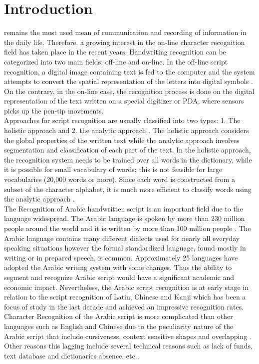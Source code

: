\documentclass[journal,compsoc]{IEEEtran}
\begin{document}
\IEEEdisplaynotcompsoctitleabstractindextext

\section{Introduction}
\date
{} remains the most used mean of communication and recording of information in the daily life. Therefore, a growing interest in the on-line character recognition field has taken place in the recent years. Handwriting recognition can be categorized into two main fields: off-line and on-line. In the off-line script recognition, a digital image containing text is fed to the computer and the system attempts to convert the spatial representation of the letters into digital symbols \cite{al2011online}. On the contrary, in the on-line case, the recognition process is done on the digital representation of the text written on a special digitizer or PDA, where sensors picks up the pen-tip movements.\\
 
Approaches for script recognition are usually classified into two types: 1. The holistic approach \cite{biadsy2011segmentation} and 2. the analytic approach \cite{abdulla2008off, sari2002off, Dinges2011, elanwar2012unconstrained}. The holistic approach considers the global properties of the written text while the analytic approach involves segmentation and classification of each part of the text.  In the holistic approach, the recognition system needs to be trained over all words in the dictionary, while it is possible for small vocabulary of words; this is not feasible for large vocabularies (20,000 words or more). Since each word is constructed from a subset of the character alphabet, it is much more efficient to classify words using the analytic approach \cite{elanwar2012unconstrained}.\\

The Recognition of Arabic handwritten script is an important field due to the language widespread. The Arabic language is spoken by more than 230 million people around the world and it is written by more than 100 million people \cite{al2011online}. The Arabic language contains many different dialects used for nearly all everyday speaking situations however the formal standardized language, found mostly in writing or in prepared speech, is common. Approximately 25 languages have adopted the Arabic writing system with some changes. Thus the ability to segment and recognize Arabic script would have a significant academic and economic impact. Nevertheless, the Arabic script recognition is at early stage in relation to the script recognition of Latin, Chinese and Kanji which has been a focus of study in the last decade and achieved an impressive recognition rates. 
Character Recognition of the Arabic script is more complicated than other languages such as English and Chinese due to the peculiarity nature of the Arabic script that include cursiveness, context sensitive shapes and overlapping \cite{razzak2010locally}. Other reasons this lagging include several technical reasons such as lack of funds, text database and dictionaries absence, etc.\cite{zeki2011segmentation}.\\
\end{document}

